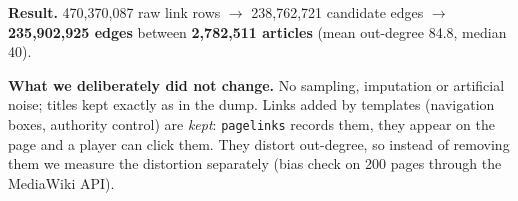 \documentclass[10pt,a4paper]{article}
\begin{document}
\normalsize
\medskip
\textbf{Result.} 470,370,087 raw link rows $\rightarrow$ 238,762,721 candidate edges $\rightarrow$
\textbf{235,902,925 edges} between \textbf{2,782,511 articles} (mean out-degree 84.8, median 40).

\textbf{What we deliberately did not change.} No sampling, imputation or artificial noise; titles kept
exactly as in the dump. Links added by templates (navigation boxes, authority control) are \emph{kept}:
\texttt{pagelinks} records them, they appear on the page and a player can click them. They distort
out-degree, so instead of removing them we measure the distortion separately (bias check on 200
pages through the MediaWiki API).
\end{document}
